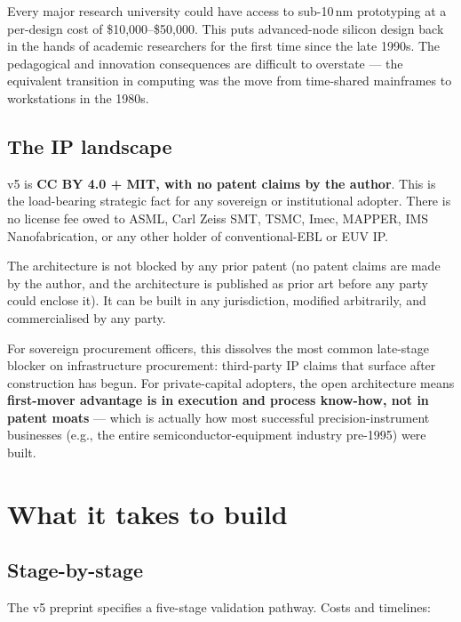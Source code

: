 \documentclass[11pt,letterpaper]{article}
\begin{document}
Every major research university could have access to sub-10\,nm prototyping at a per-design cost of \$10{,}000--\$50{,}000. This puts advanced-node silicon design back in the hands of academic researchers for the first time since the late 1990s. The pedagogical and innovation consequences are difficult to overstate --- the equivalent transition in computing was the move from time-shared mainframes to workstations in the 1980s.

\subsection{The IP landscape}

v5 is \textbf{CC BY 4.0 + MIT, with no patent claims by the author}. This is the load-bearing strategic fact for any sovereign or institutional adopter. There is no license fee owed to ASML, Carl Zeiss SMT, TSMC, Imec, MAPPER, IMS Nanofabrication, or any other holder of conventional-EBL or EUV IP.

The architecture is not blocked by any prior patent (no patent claims are made by the author, and the architecture is published as prior art before any party could enclose it). It can be built in any jurisdiction, modified arbitrarily, and commercialised by any party.

For sovereign procurement officers, this dissolves the most common late-stage blocker on infrastructure procurement: third-party IP claims that surface after construction has begun. For private-capital adopters, the open architecture means \textbf{first-mover advantage is in execution and process know-how, not in patent moats} --- which is actually how most successful precision-instrument businesses (e.g., the entire semiconductor-equipment industry pre-1995) were built.

\section{What it takes to build}

\subsection{Stage-by-stage}

The v5 preprint specifies a five-stage validation pathway. Costs and timelines:
\end{document}
